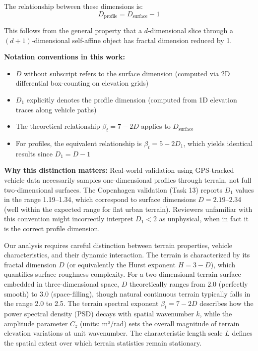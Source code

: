 \documentclass[11pt]{article}
\begin{document}
The relationship between these dimensions is:
\begin{equation}
D_{\text{profile}} = D_{\text{surface}} - 1
\end{equation}

This follows from the general property that a $d$-dimensional slice through a $(d+1)$-dimensional self-affine object has fractal dimension reduced by 1.

\textbf{Notation conventions in this work:}
\begin{itemize}
\item $D$ without subscript refers to the surface dimension (computed via 2D differential box-counting on elevation grids)
\item $D_1$ explicitly denotes the profile dimension (computed from 1D elevation traces along vehicle paths)
\item The theoretical relationship $\beta_t = 7-2D$ applies to $D_{\text{surface}}$
\item For profiles, the equivalent relationship is $\beta_t = 5-2D_1$, which yields identical results since $D_1 = D-1$
\end{itemize}

\textbf{Why this distinction matters:} Real-world validation using GPS-tracked vehicle data necessarily samples one-dimensional profiles through terrain, not full two-dimensional surfaces. The Copenhagen validation (Task 13) reports $D_1$ values in the range 1.19--1.34, which correspond to surface dimensions $D = 2.19$--2.34 (well within the expected range for flat urban terrain). Reviewers unfamiliar with this convention might incorrectly interpret $D_1 < 2$ as unphysical, when in fact it is the correct profile dimension.

\vspace{0.5cm}

Our analysis requires careful distinction between terrain properties, vehicle characteristics, and their dynamic interaction. The terrain is characterized by its fractal dimension $D$ (or equivalently the Hurst exponent $H = 3-D$), which quantifies surface roughness complexity. For a two-dimensional terrain surface embedded in three-dimensional space, $D$ theoretically ranges from 2.0 (perfectly smooth) to 3.0 (space-filling), though natural continuous terrain typically falls in the range 2.0 to 2.5. The terrain spectral exponent $\beta_t = 7-2D$ describes how the power spectral density (PSD) decays with spatial wavenumber $k$, while the amplitude parameter $C_z$ (units: m³/rad) sets the overall magnitude of terrain elevation variations at unit wavenumber. The characteristic length scale $L$ defines the spatial extent over which terrain statistics remain stationary.
\end{document}
